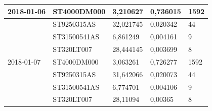 \documentclass{VUMIFPSkursinis}
\begin{document}
\begin{table}[H]
{\begin{tabular}{|l|l|l|l|l|}
2018-01-06                          & ST4000DM000                           & 3,210627                               & 0,736015                             & 1592                                 \\ \hline
\cellcolor[HTML]{C0C0C0}            & ST9250315AS                           & 32,021745                              & 0,020342                             & 44                                   \\ \hline
\cellcolor[HTML]{C0C0C0}            & ST31500541AS                          & 6,861249                               & 0,004161                             & 9                                    \\ \hline
\cellcolor[HTML]{C0C0C0}            & ST320LT007                            & 28,444145                              & 0,003699                             & 8                                    \\ \hline
2018-01-07                          & ST4000DM000                           & 3,063261                               & 0,726277                             & 1592                                 \\ \hline
\cellcolor[HTML]{C0C0C0}            & ST9250315AS                           & 31,642066                              & 0,020073                             & 44                                   \\ \hline
\cellcolor[HTML]{C0C0C0}            & ST31500541AS                          & 6,774701                               & 0,004106                             & 9                                    \\ \hline
\cellcolor[HTML]{C0C0C0}            & ST320LT007                            & 28,11094                               & 0,00365                              & 8                                    \\ \hline
\end{tabular}}
\end{table}
\end{document}
